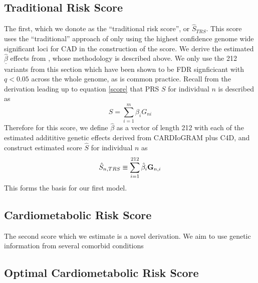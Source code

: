 \subsection{Traditional Risk Score}

The first, which we donote as the ``traditional risk score'', or $\hat{S}_{TRS}$. This score uses the ``traditional'' approach of only using the highest confidence genome wide significant loci for \ac{CAD} in the construction of the score. We derive the estimated $\underline{\hat{\beta}}$ effects from \citep{TheCARDIoGRAMplusC4DConsortium2015}, whose methodology is described above. We only use the 212 variants from this section which have been shown to be FDR signficicant with $q < 0.05$ across the whole genome, as is common practice. Recall from the derivation leading up to equation \ref{score} that \ac{PRS} $S$ for individual $n$ is described as  $$ S = \sum^m_{i=1} \beta_i G_{ni} $$ Therefore for this score, we define $\hat{\beta}$ as a vector of length 212 with each of the estimated addititive genetic effects derived from CARDIoGRAM plus C4D, and construct estimated score $\hat{S}$ for individual $n$ as $$ \hat{S}_{n, TRS} \equiv \sum^{212}_{i = 1} \hat{\beta}_i \bold{G}_{n, i} $$ This forms the basis for our first model.

\subsection{Cardiometabolic Risk Score}

The second score which we estimate is a novel derivation. We aim to use genetic information from several comorbid conditions 


\subsection{Optimal Cardiometabolic Risk Score}

